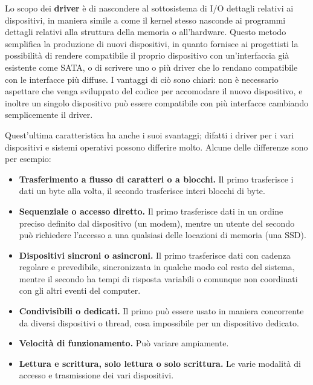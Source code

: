    Lo scopo dei \textbf{driver} è di nascondere al sottosistema di I/O dettagli relativi ai dispositivi, in maniera simile a come il kernel stesso nasconde ai programmi dettagli relativi alla struttura della memoria o all'hardware. Questo metodo semplifica la produzione di nuovi dispositivi, in quanto fornisce ai progettisti la possibilità di rendere compatibile il proprio dispositivo con un'interfaccia già esistente come SATA, o di scrivere uno o più driver che lo rendano compatibile con le interfacce più diffuse. I vantaggi di ciò sono chiari: non è necessario aspettare che venga sviluppato del codice per accomodare il nuovo dispositivo, e inoltre un singolo dispositivo può essere compatibile con più interfacce cambiando semplicemente il driver.
    
    Quest'ultima caratteristica ha anche i suoi svantaggi; difatti i driver per i vari dispositivi e sistemi operativi possono differire molto. Alcune delle differenze sono per esempio:
    \begin{itemize}
        \item \textbf{Trasferimento a flusso di caratteri o a blocchi.} Il primo trasferisce i dati un byte alla volta, il secondo trasferisce interi blocchi di byte.
        
        \item \textbf{Sequenziale o accesso diretto.} Il primo trasferisce dati in un ordine preciso definito dal dispositivo (un modem), mentre un utente del secondo può richiedere l'accesso a una qualsiasi delle locazioni di memoria (una SSD).
        
        \item \textbf{Dispositivi sincroni o asincroni.} Il primo trasferisce dati con cadenza regolare e prevedibile, sincronizzata in qualche modo col resto del sistema, mentre il secondo ha tempi di risposta variabili o comunque non coordinati con gli altri eventi del computer.
        
        \item \textbf{Condivisibili o dedicati.} Il primo può essere usato in maniera concorrente da diversi dispositivi o thread, cosa impossibile per un dispositivo dedicato.
        
        \item \textbf{Velocità di funzionamento.} Può variare ampiamente.
        
        \item \textbf{Lettura e scrittura, solo lettura o solo scrittura.} Le varie modalità di accesso e trasmissione dei vari dispositivi.
    \end{itemize}
    
